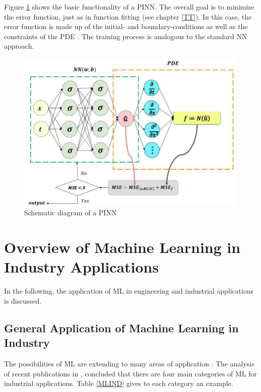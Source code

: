 Figure \ref{fig:piml} shows the basic functionality of a PINN. The overall goal is to minimize the error function, just as in function fitting (see chapter \ref{TT}). In this case, the error function is made up of the initial- and boundary-conditions as well as the constraints of the PDE \cite{Guo}. The training process is analogous to the standard NN approach. 
\begin{figure}[H]
	\centering
	\includegraphics[width=0.7\linewidth]{IMGs/piml.png}
	\caption{Schematic diagram of a PINN \cite{Guo}}
	\label{fig:piml}
\end{figure}




\newpage
\section{Overview of Machine Learning in Industry Applications}
In the following, the application of ML in engineering and industrial applications is discussed.
\subsection{General Application of Machine Learning in Industry}
The possibilities of ML are extending to many areas of application \cite{Deiana}. The analysis of recent publications in \cite{Bertolini}, concluded that there are four main categories of ML for industrial applications. Table \ref{MLIND} gives to each category an example.


